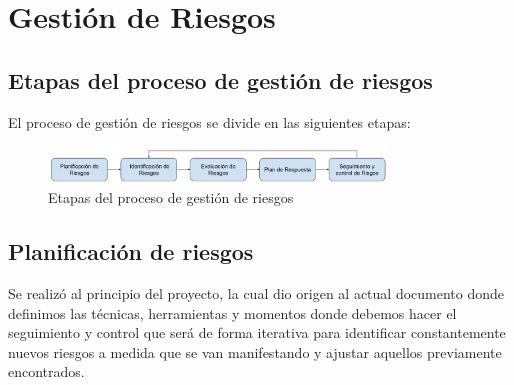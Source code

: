 \section{Gestión de Riesgos}\label{sec:gestionDeRiesgos}

\subsection{Etapas del proceso de gestión de riesgos}\label{subsec:etapasGestionDeRiesgos}

El proceso de gestión de riesgos se divide en las siguientes etapas:

\begin{figure}[H]
    \centering
    \includegraphics[width=0.8\textwidth]{../imagenes/secciones/6-Gestion-del-proyecto/Proceso de gestion de riesgos.jpg}
    \caption{Etapas del proceso de gestión de riesgos}
    \label{fig:etapasDelProcesoDeGestionDeRiesgos}
\end{figure}

\subsection{Planificación de riesgos}\label{subsec:planificacionDeRiesgos}

Se realizó al principio del proyecto, la cual dio origen al actual documento donde definimos las técnicas, herramientas y momentos donde 
debemos hacer el seguimiento y control que será de forma iterativa para identificar constantemente nuevos riesgos a medida que se van 
manifestando y ajustar aquellos previamente encontrados. 

